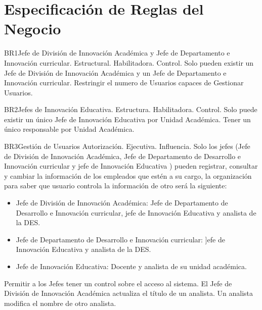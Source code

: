 \chapter{Especificación de Reglas del Negocio}

\begin{BussinesRule}{BR1}{Jefe de División de Innovación Académica y Jefe de Departamento e Innovación curricular.}
    \BRitem[Tipo:] Estructural.
    \BRitem[Clase:] Habilitadora.
    \BRitem[Nivel:] Control.
    \BRitem[Descripción:] Solo pueden existir un Jefe de División de Innovación Académica y un Jefe de Departamento e Innovación curricular.
    \BRitem[Motivación:] Restringir el numero de Usuarios capaces de Gestionar Usuarios.
\end{BussinesRule}

\begin{BussinesRule}{BR2}{Jefes de Innovación Educativa.}
    \BRitem[Tipo:] Estructura.
    \BRitem[Clase:] Habilitadora.
    \BRitem[Nivel:] Control.
    \BRitem[Descripción:] Solo puede existir un único Jefe de Innovación Educativa por Unidad Académica.
    \BRitem[Motivación:] Tener un único responsable por Unidad Académica.
\end{BussinesRule}

\begin{BussinesRule}{BR3}{Gestión de Usuarios}
    \BRitem[Tipo:] Autorización.
    \BRitem[Clase:] Ejecutiva.
    \BRitem[Nivel:] Influencia.
    \BRitem[Descripción:] Solo los jefes (Jefe de División de Innovación Académica, Jefe de Departamento de Desarrollo e Innovación curricular y jefe de Innovación Educativa ) pueden registrar, consultar y cambiar  la información de los empleados que estén a su cargo, la organización para saber que usuario controla  la información de otro  será la siguiente:
    \begin{itemize}
        \item Jefe de División de Innovación Académica: Jefe de Departamento de Desarrollo e Innovación curricular, jefe de Innovación Educativa y analista de la DES.
        \item Jefe de Departamento de Desarrollo e Innovación curricular: ]efe de Innovación Educativa y analista de la DES.
        \item Jefe de Innovación Educativa: Docente y analista de su unidad académica.
    \end{itemize}
    \BRitem[Motivación:] Permitir a los Jefes tener un control sobre el acceso al sistema.
     El Jefe de División de Innovación Académica  actualiza el título de un analista.
     Un analista modifica  el nombre de otro analista.
\end{BussinesRule}

